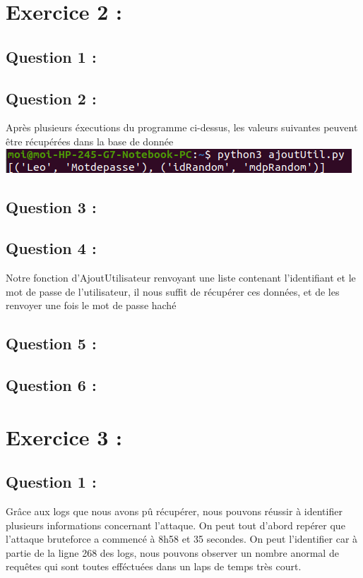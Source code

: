 \documentclass{article}
\begin{document}
\section{Exercice 2 :}
    \subsection{Question 1 :}
        
    \subsection{Question 2 :}
        Après plusieurs éxecutions du programme ci-dessus, les valeurs suivantes peuvent être récupérées dans la base de donnée\newline
        \includegraphics[scale = 0.5]{ajoutUtil.png}
    \subsection{Question 3 :}
        
    \subsection{Question 4 :}
        Notre fonction d'AjoutUtilisateur renvoyant une liste contenant l'identifiant et le mot de passe de l'utilisateur,
        il nous suffit de récupérer ces données, et de les renvoyer une fois le mot de passe haché
        
    \subsection{Question 5 :}
        
    \subsection{Question 6 :}
        
\newpage
\section{Exercice 3 :}
    \subsection{Question 1 :}
        Grâce aux logs que nous avons pû récupérer, nous pouvons réussir à identifier plusieurs informations concernant l'attaque.\newline
        On peut tout d'abord repérer que l'attaque bruteforce a commencé à 8h58 et 35 secondes.
        On peut l'identifier car à partie de la ligne 268 des logs, nous pouvons observer un nombre anormal de requêtes qui sont toutes efféctuées dans un laps de temps très court.
\end{document}
